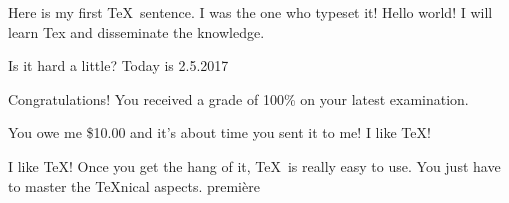\nopagenumbers
Here is my first \TeX\ sentence.
I was the one who typeset it! Hello world! I will learn
Tex and disseminate the knowledge.

Is it hard a little?
Today is 2.5.2017

Congratulations! You received a grade of 100\% on your latest
examination.

You owe me \$10.00 and it’s about time you sent it to me!
I like \TeX!

I like \TeX! Once you get the hang of it, \TeX\ is really easy to use. You just have to
master the \TeX nical aspects.
premi\`ere
\bye

